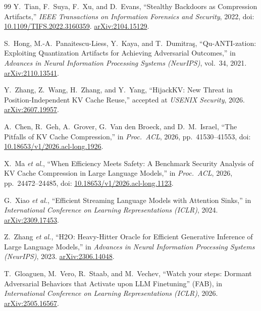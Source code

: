 \documentclass[11pt,a4paper]{article}
\begin{document}
\begin{thebibliography}{99}
 Y.~Tian, F.~Suya, F.~Xu, and D.~Evans, ``Stealthy Backdoors as Compression Artifacts,'' \emph{IEEE Transactions on Information Forensics and Security}, 2022, doi: \href{https://doi.org/10.1109/TIFS.2022.3160359}{10.1109/TIFS.2022.3160359}. \href{https://arxiv.org/abs/2104.15129}{arXiv:2104.15129}.

 S.~Hong, M.-A.~Panaitescu-Liess, Y.~Kaya, and T.~Dumitra\c{s}, ``Qu-ANTI-zation: Exploiting Quantization Artifacts for Achieving Adversarial Outcomes,'' in \emph{Advances in Neural Information Processing Systems (NeurIPS)}, vol.~34, 2021. \href{https://arxiv.org/abs/2110.13541}{arXiv:2110.13541}.

 Y.~Zhang, Z.~Wang, H.~Zhang, and Y.~Yang, ``HijackKV: New Threat in Position-Independent KV Cache Reuse,'' accepted at \emph{USENIX Security}, 2026. \href{https://arxiv.org/abs/2607.19957}{arXiv:2607.19957}.

 A.~Chen, R.~Geh, A.~Grover, G.~Van den Broeck, and D.~M.~Israel, ``The Pitfalls of KV Cache Compression,'' in \emph{Proc.\ ACL}, 2026, pp.~41530--41553, doi: \href{https://doi.org/10.18653/v1/2026.acl-long.1926}{10.18653/v1/2026.acl-long.1926}.

 X.~Ma \emph{et al.}, ``When Efficiency Meets Safety: A Benchmark Security Analysis of KV Cache Compression in Large Language Models,'' in \emph{Proc.\ ACL}, 2026, pp.~24472--24485, doi: \href{https://doi.org/10.18653/v1/2026.acl-long.1123}{10.18653/v1/2026.acl-long.1123}.

 G.~Xiao \emph{et al.}, ``Efficient Streaming Language Models with Attention Sinks,'' in \emph{International Conference on Learning Representations (ICLR)}, 2024. \href{https://arxiv.org/abs/2309.17453}{arXiv:2309.17453}.

 Z.~Zhang \emph{et al.}, ``H2O: Heavy-Hitter Oracle for Efficient Generative Inference of Large Language Models,'' in \emph{Advances in Neural Information Processing Systems (NeurIPS)}, 2023. \href{https://arxiv.org/abs/2306.14048}{arXiv:2306.14048}.

 T.~Gloaguen, M.~Vero, R.~Staab, and M.~Vechev, ``Watch your steps: Dormant Adversarial Behaviors that Activate upon LLM Finetuning'' (FAB), in \emph{International Conference on Learning Representations (ICLR)}, 2026. \href{https://arxiv.org/abs/2505.16567}{arXiv:2505.16567}.


\end{thebibliography}
\end{document}
